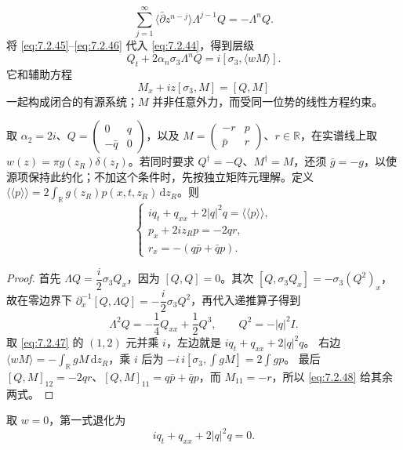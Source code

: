 \documentclass[lang=cn,scheme=chinese,mode=simple,device=normal,color=blue,math=cm,thmcnt=section,12pt]{elegantbook}
\newcommand{\dd}{\,\mathrm{d}}
\newcommand{\eqq}[2]{\tag{#1}\label{eq:#1}#2}
\begin{document}
\begin{equation}
\eqq{7.2.46}{\sum\limits_{j=1}^{\infty}\langle\bar\partial z^{n-j}\rangle\Lambda^{j-1}Q=-\Lambda^nQ.}
\end{equation}
将 \eqref{eq:7.2.45}--\eqref{eq:7.2.46} 代入 \eqref{eq:7.2.44}，得到层级
\begin{equation}
\eqq{7.2.47}{Q_t+2\alpha_n\sigma_3\Lambda^nQ=i[\sigma_3,\langle wM\rangle].}
\end{equation}
它和辅助方程
\begin{equation}
\eqq{7.2.48}{M_x+iz[\sigma_3,M]=[Q,M]}
\end{equation}
一起构成闭合的有源系统；$M$ 并非任意外力，而受同一位势的线性方程约束。

\begin{example}[有源 NLS]
取 $\alpha_2=2i$、$Q=\begin{pmatrix}0&q\\-\bar q&0\end{pmatrix}$，以及
$M=\begin{pmatrix}-r&p\\\bar p&r\end{pmatrix}$、$r\in\mathbb R$，在实谱线上取
$w(z)=\pi g(z_R)\delta(z_I)$。若同时要求 $Q^\dagger=-Q$、$M^\dagger=M$，还须 $\bar g=-g$，以使源项保持此约化；不加这个条件时，先按独立矩阵元理解。定义
$\langle\!\langle p\rangle\!\rangle=2\displaystyle\int_{\mathbb R}g(z_R)p(x,t,z_R)\dd z_R$。则
\begin{equation}
\eqq{7.2.49}{\begin{cases}
iq_t+q_{xx}+2|q|^2q=\langle\!\langle p\rangle\!\rangle,\\
p_x+2iz_Rp=-2qr,\\
r_x=-(q\bar p+\bar qp).
\end{cases}}
\end{equation}
\end{example}
\begin{proof}
首先 $\Lambda Q=\dfrac{i}{2}\sigma_3Q_x$，因为 $[Q,Q]=0$。其次
$[Q,\sigma_3Q_x]=-\sigma_3(Q^2)_x$，故在零边界下
$\partial_x^{-1}[Q,\Lambda Q]=-\dfrac{i}{2}\sigma_3Q^2$，再代入递推算子得到
\[
\Lambda^2Q=-\dfrac{1}{4}Q_{xx}+\dfrac{1}{2}Q^3,
\qquad Q^2=-|q|^2I.
\]
取 \eqref{eq:7.2.47} 的 $(1,2)$ 元并乘 $i$，左边就是 $iq_t+q_{xx}+2|q|^2q$。
右边 $\langle wM\rangle=-\displaystyle\int_{\mathbb R}gM\dd z_R$，乘 $i$ 后为
$\displaystyle-i\,i[\sigma_3,\int gM]=2\int gp$。
最后 $[Q,M]_{12}=-2qr$、$[Q,M]_{11}=q\bar p+\bar qp$，而 $M_{11}=-r$，所以 \eqref{eq:7.2.48} 给其余两式。
\end{proof}
取 $w=0$，第一式退化为
\begin{equation}
\eqq{7.2.50}{iq_t+q_{xx}+2|q|^2q=0.}
\end{equation}
\end{document}
